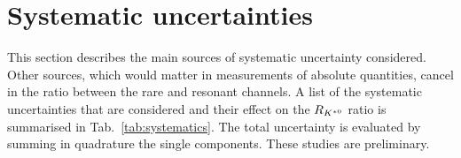\section{Systematic uncertainties}
\label{sec:systematics}

This section describes the main sources of systematic uncertainty considered.
Other sources, which would matter in measurements of absolute quantities,
cancel in the ratio between the rare and resonant channels.
%
A list of the systematic uncertainties that are considered and their effect on the $R_{{{K}^{*0}}}$
ratio is summarised in Tab.~\ref{tab:systematics}.
The total uncertainty is evaluated by summing in quadrature the single components.
These studies are preliminary.

\begin{table}[t!]
\begin{center}
\caption{Summary of the relative percent systematic uncertainties on \RKst.}
\renewcommand\arraystretch{1.25}
\label{tab:systematics}
\end{center}
\end{table}
